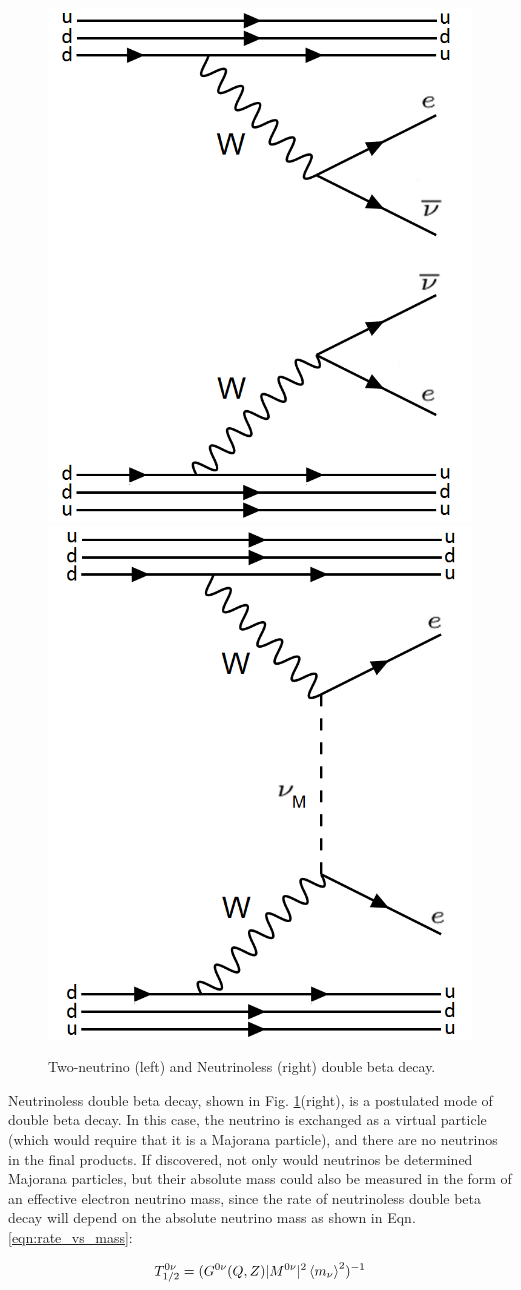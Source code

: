 \begin{figure}[H]
                \includegraphics[width=.35\textwidth]{figures/feynman_2nu_quarks.png}
                \includegraphics[width=.35\textwidth]{figures/feynman_0nu_quarks.png}
                \caption{Two-neutrino (left) and Neutrinoless (right) double beta decay.}
        \label{fig:feynman_diags}
\end{figure}

Neutrinoless double beta decay, shown in Fig. \ref{fig:feynman_diags}(right), is a postulated mode of double beta decay. In this case, the neutrino is exchanged as a virtual particle (which would require that it is a Majorana particle), and there are no neutrinos in the final products. If discovered, not only would neutrinos be determined Majorana particles, but their absolute mass could also be measured in the form of an effective electron neutrino mass, since the rate of neutrinoless double beta decay will depend on the absolute neutrino mass as shown in Eqn. \ref{eqn:rate_vs_mass}:

\begin{equation}
T_{1/2}^{0\nu} = (G^{0\nu}(Q,Z)|M^{0\nu}|^{2}\braket{m_{\nu}}^{2})^{-1}
\label{eqn:rate_vs_mass}
\end{equation}

